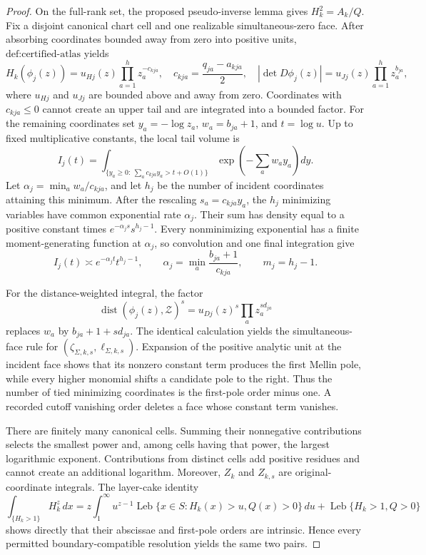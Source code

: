 \documentclass{article}
\begin{document}
\begin{proof}
On the full-rank set, the proposed pseudo-inverse lemma gives \(H_k^2=A_k/Q\). Fix a disjoint canonical chart cell and one realizable simultaneous-zero face. After absorbing coordinates bounded away from zero into positive units, \(\text{def:certified-atlas}\) yields
\[
H_k(\phi_j(z))
=u_{Hj}(z)\prod_{a=1}^h z_a^{-c_{kja}},
\quad
c_{kja}=\frac{q_{ja}-a_{kja}}2,
\quad
|\det D\phi_j(z)|=u_{Jj}(z)\prod_{a=1}^h z_a^{b_{ja}},
\]
where \(u_{Hj}\) and \(u_{Jj}\) are bounded above and away from zero. Coordinates with \(c_{kja}\le0\) cannot create an upper tail and are integrated into a bounded factor. For the remaining coordinates set \(y_a=-\log z_a\), \(w_a=b_{ja}+1\), and \(t=\log u\). Up to fixed multiplicative constants, the local tail volume is
\[
I_j(t)=\int_{\{y_a\ge0:\ \sum_ac_{kja}y_a>t+O(1)\}}
\exp\!\left(-\sum_aw_ay_a\right)dy.
\]
Let \(\alpha_j=\min_a w_a/c_{kja}\), and let \(h_j\) be the number of incident coordinates attaining this minimum. After the rescaling \(s_a=c_{kja}y_a\), the \(h_j\) minimizing variables have common exponential rate \(\alpha_j\). Their sum has density equal to a positive constant times \(e^{-\alpha_j s}s^{h_j-1}\). Every nonminimizing exponential has a finite moment-generating function at \(\alpha_j\), so convolution and one final integration give
\[
I_j(t)\asymp e^{-\alpha_jt}t^{h_j-1},
\qquad
\alpha_j=\min_a\frac{b_{ja}+1}{c_{kja}},
\qquad m_j=h_j-1.
\]

For the distance-weighted integral, the factor
\[
\operatorname{dist}(\phi_j(z),\mathcal Z)^s
=u_{Dj}(z)^s\prod_a z_a^{s d_{ja}}
\]
replaces \(w_a\) by \(b_{ja}+1+s d_{ja}\). The identical calculation yields the simultaneous-face rule for \((\zeta_{\Sigma,k,s},\ell_{\Sigma,k,s})\). Expansion of the positive analytic unit at the incident face shows that its nonzero constant term produces the first Mellin pole, while every higher monomial shifts a candidate pole to the right. Thus the number of tied minimizing coordinates is the first-pole order minus one. A recorded cutoff vanishing order deletes a face whose constant term vanishes.

There are finitely many canonical cells. Summing their nonnegative contributions selects the smallest power and, among cells having that power, the largest logarithmic exponent. Contributions from distinct cells add positive residues and cannot create an additional logarithm. Moreover, \(Z_k\) and \(Z_{k,s}\) are original-coordinate integrals. The layer-cake identity
\[
\int_{\{H_k>1\}}H_k^z\,dx
=z\int_1^\infty u^{z-1}\operatorname{Leb}\{x\in S:H_k(x)>u,Q(x)>0\}\,du
+\operatorname{Leb}\{H_k>1,Q>0\}
\]
shows directly that their abscissae and first-pole orders are intrinsic. Hence every permitted boundary-compatible resolution yields the same two pairs.


\end{proof}
\end{document}
